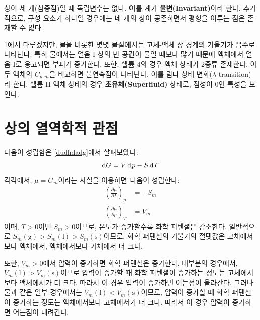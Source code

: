         상이 세 개(삼중점)일 때 독립변수는 없다. 이를 계가 \textbf{불변(Invariant)}이라 한다. 
        추가적으로, 구성 요소가 하나일 경우에는 네 개의 상이 공존하면서 평형을 이루는 점은 존재할 수 없다.
        \par \ref{phasethermo}에서 다루겠지만, 물을 비롯한 몇몇 물질에서는 고체-액체 상 경계의 기울기가 음수로 나타난다. 특히 물에서는 얼음 I 상의 빈 공간이 
        물일 때보다 많기 때문에 액체에서 얼음 I로 응고되면 부피가 증가한다. 또한, 헬륨-4의 경우 액체 상태가 2종류 존재한다. 이 두 액체의 $\displaystyle C_{p,m}$을 비교하면 불연속점이 
        나타난다. 이를 람다-상태 변화($\lambda$-transition)라 한다. 헬륨-II 액체 상태의 경우 \textbf{초유체(Superfluid)} 상태로, 점성이 0인 특성을 보인다.
    \section{상의 열역학적 관점}\label{phasethermo}
        \hspace{\parindent} 다음이 성립함은 \ref{dudhdadg}에서 살펴보았다:
        \begin{equation*}
            \operatorname{d\!} G = V\operatorname{d\!} p-S\operatorname{d\!} T
        \end{equation*}
        각각에서, $\mu = G_m$이라는 사실을 이용하면 다음이 성립한다:
        \begin{equation*}
            \begin{aligned}
                \left(\frac{\partial \mu}{\partial T}\right)_p &= -S_m \\
                \left(\frac{\partial \mu}{\partial p}\right)_T &= V_m
            \end{aligned}
        \end{equation*}
        이때, $T>0$이면 $S_m>0$이므로, 온도가 증가할수록 화학 퍼텐셜은 감소한다. 
        일반적으로 $S_m\left(\mathrm{g}\right)>S_m\left(\mathrm{l}\right)>S_m\left(\mathrm{s}\right)$이므로, 화학 퍼텐셜의 기울기의 절댓값은 
        고체에서보다 액체에서, 액체에서보다 기체에서 더 크다.
        \par 또한, $V_m>0$에서 압력이 증가하면 화학 퍼텐셜은 증가한다. 대부분의 경우에서, $V_m\left(\mathrm{l}\right)>V_m\left(\mathrm{s}\right)$이므로 
        압력이 증가할 때 화학 퍼텐셜이 증가하는 정도는 고체에서보다 액체에서가 더 크다. 따라서 이 경우 압력이 증가하면 어는점이 올라간다. 
        그러나 물과 같은 일부 경우에서는 $V_m\left(\mathrm{l}\right)< V_m\left(\mathrm{s}\right)$이므로, 
        압력이 증가할 때 화학 퍼텐셜이 증가하는 정도는 액체에서보다 고체에서가 더 크다. 따라서 이 경우 압력이 증가하면 어는점이 내려간다.
